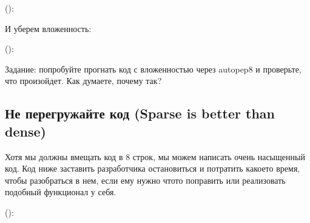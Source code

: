\documentclass[letterpaper,10pt,russian]{sphinxmanual}
\begin{document}
\sphinxAtStartPar
():

\begin{sphinxVerbatim}[commandchars=\\\{\}]
   
       
           
                
                     
     
\end{sphinxVerbatim}

\sphinxAtStartPar
И уберем вложенность:

\sphinxAtStartPar
():

\begin{sphinxVerbatim}[commandchars=\\\{\}]
   
       
         
       
         
        
         
         
\end{sphinxVerbatim}

\sphinxAtStartPar
Задание: попробуйте прогнать код с вложенностью через autopep8 и проверьте, что произойдет. Как думаете, почему так?


\subsection{Не перегружайте код (Sparse is better than dense)}
\label{\detokenize{educational_materials/styles/content:sparse-is-better-than-dense}}
\sphinxAtStartPar
Хотя мы должны вмещать код в 8 строк, мы можем написать очень насыщенный код. Код ниже заставить разработчика остановиться и потратить какое\sphinxhyphen{}то время, чтобы разобраться в нем, если ему нужно что\sphinxhyphen{}то поправить или реализовать подобный функционал у себя.

\sphinxAtStartPar
():
\end{document}
